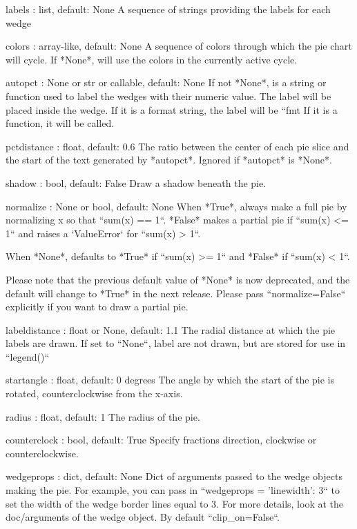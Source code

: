 \begin{DoxyVerb}
\begin{DoxyVerb}
labels : list, default: None
    A sequence of strings providing the labels for each wedge

colors : array-like, default: None
    A sequence of colors through which the pie chart will cycle.  If
    *None*, will use the colors in the currently active cycle.

autopct : None or str or callable, default: None
    If not *None*, is a string or function used to label the wedges
    with their numeric value.  The label will be placed inside the
    wedge.  If it is a format string, the label will be ``fmt %
    If it is a function, it will be called.

pctdistance : float, default: 0.6
    The ratio between the center of each pie slice and the start of
    the text generated by *autopct*.  Ignored if *autopct* is *None*.

shadow : bool, default: False
    Draw a shadow beneath the pie.

normalize : None or bool, default: None
    When *True*, always make a full pie by normalizing x so that
    ``sum(x) == 1``. *False* makes a partial pie if ``sum(x) <= 1``
    and raises a `ValueError` for ``sum(x) > 1``.

    When *None*, defaults to *True* if ``sum(x) >= 1`` and *False* if
    ``sum(x) < 1``.

    Please note that the previous default value of *None* is now
    deprecated, and the default will change to *True* in the next
    release. Please pass ``normalize=False`` explicitly if you want to
    draw a partial pie.

labeldistance : float or None, default: 1.1
    The radial distance at which the pie labels are drawn.
    If set to ``None``, label are not drawn, but are stored for use in
    ``legend()``

startangle : float, default: 0 degrees
    The angle by which the start of the pie is rotated,
    counterclockwise from the x-axis.

radius : float, default: 1
    The radius of the pie.

counterclock : bool, default: True
    Specify fractions direction, clockwise or counterclockwise.

wedgeprops : dict, default: None
    Dict of arguments passed to the wedge objects making the pie.
    For example, you can pass in ``wedgeprops = {'linewidth': 3}``
    to set the width of the wedge border lines equal to 3.
    For more details, look at the doc/arguments of the wedge object.
    By default ``clip_on=False``.


\end{DoxyVerb}
\end{DoxyVerb}
